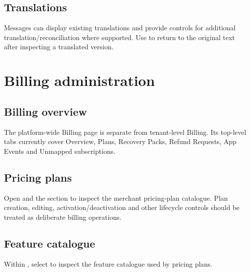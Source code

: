 
\section{Translations}
Messages can display existing translations and provide controls for additional translation/reconciliation where supported. Use  to return to the original text after inspecting a translated version.


\chapter{Billing administration}

\section{Billing overview}
The platform-wide Billing page is separate from tenant-level Billing. Its top-level tabs currently cover Overview, Plans, Recovery Packs, Refund Requests, App Events and Unmapped subscriptions.


\section{Pricing plans}
Open  and the  section to inspect the merchant pricing-plan catalogue. Plan creation, editing, activation/deactivation and other lifecycle controls should be treated as deliberate billing operations.


\section{Feature catalogue}
Within , select  to inspect the feature catalogue used by pricing plans.


